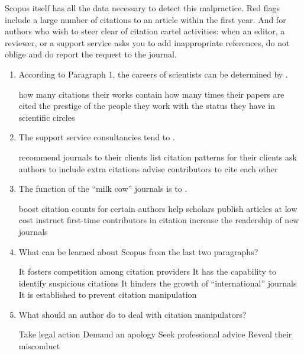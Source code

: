 Scopus itself has all the data necessary to detect this malpractice. Red flags include a large number of citations to an article within the first year. And for authors who wish to steer clear of citation cartel activities: when an editor, a reviewer, or a support service asks you to add inappropriate references, do not oblige and do report the request to the journal.



\begin{enumerate}[resume]
	
\item

According to Paragraph 1, the careers of scientists can be determined by \lineread.

\fourchoices
{how many citations their works contain}
{how many times their papers are cited}
{the prestige of the people they work with}
{the status they have in scientific circles}

\item

The support service consultancies tend to \lineread.

\fourchoices
{recommend journals to their clients}
{list citation patterns for their clients}
{ask authors to include extra citations}
{advise contributors to cite each other}

\item

The function of the ``milk cow'' journals is to \lineread.

\fourchoices
{boost citation counts for certain authors}
{help scholars publish articles at low cost}
{instruct first-time contributors in citation}
{increase the readership of new journals}

\item

What can be learned about Scopus from the last two paragraphs?

\fourchoices
{It fosters competition among citation providers}
{It has the capability to identify suspicious citations}
{It hinders the growth of ``international'' journals}
{It is established to prevent citation manipulation}

\item

What should an author do to deal with citation manipulators?

\fourchoices
{Take legal action}
{Demand an apology}
{Seek professional advice}
{Reveal their misconduct}
	
\end{enumerate}

